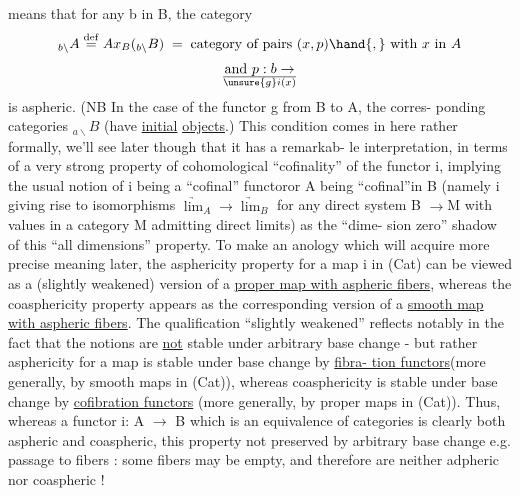 means that for any b in B, the category
\[ {}_{b\backslash}A \overset{\mathrm{def}}{=} Ax_B({}_{b\backslash}B) \;=\; \text{category of pairs } (x,p)\hand{,} \text{ with } x \text{ in } A \]
\[ \text{and } p : b \rightarrow \over{\unsure{g}}{i}(x) \]
is aspheric. (NB In the case of the functor g from B to A, the corres-%
ponding categories ${}_{a\backslash}B$  (have \uline{initial} \uline{objects}.) This condition comes in
here rather formally, we'll see later though that it has a   remarkab-%
le interpretation, in terms of a very strong property of cohomological
``cofinality'' of the functor i, implying the usual notion of i being a
``cofinal'' functor\hand{,}or A being ``cofinal''in B (namely i giving rise to
isomorphisms $\underrightarrow{\lim}_A \longrightarrow \underrightarrow{\lim}_B$ for any  direct system
B $\longrightarrow$M with values in a category M admitting direct limits)\hand{,} as the ``dime-%
sion zero'' shadow of this ``all dimensions'' property. To make an anology
which will acquire more precise meaning later, the asphericity property
for a map i in (Cat) can be viewed as a (slightly weakened) version of
a \uline{proper map with aspheric fibers}, whereas the coasphericity property
appears as the corresponding version of a \uline{smooth map with aspheric fibers}.
The qualification ``slightly weakened'' reflects notably in the fact that
the notions   are \uline{not} stable under arbitrary base change -
but rather\hand{,} asphericity for a map is stable under base change by  \uline{fibra-%
tion functors}(more generally, by  smooth maps in (Cat)), whereas
coasphericity is stable under base change by \uline{cofibration functors}
(more generally, by proper maps in (Cat)). Thus, whereas a functor
i: A $\longrightarrow$ B which is an equivalence of categories is clearly both aspheric
and coaspheric, this property   not preserved by arbitrary base
change e.g. passage to fibers :  some fibers may be empty, and therefore
are neither adpheric nor coaspheric !

